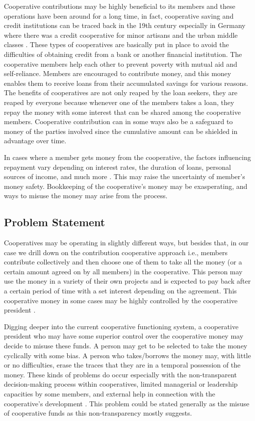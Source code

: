 \documentclass{article}
\begin{document}
\begin{flushleft}
Cooperative contributions may be highly beneficial to its members and these operations have been around for a long time, in fact, cooperative saving and credit institutions can be traced back in the 19th century especially in Germany where there was a credit cooperative for minor artisans and the urban middle classes \cite{galor2018saving}. These types of cooperatives are basically put in place to avoid the difficulties of obtaining credit from a bank or another financial institution. The cooperative members help each other to prevent poverty with mutual aid and self-reliance. Members are encouraged to contribute money, and this money enables them to receive loans from their accumulated savings for various reasons. The benefits of cooperatives are not only reaped by the loan seekers, they are reaped by everyone because whenever one of the members takes a loan, they repay the money with some interest that can be shared among the cooperative members. Cooperative contribution can in some ways also be a safeguard to money of the parties involved since the cumulative amount can be shielded in advantage over time. \cite{galor2018saving}

In cases where a member gets money from the cooperative, the factors influencing repayment vary depending on interest rates, the duration of loans, personal sources of income, and much more \cite{papias2009repayment}. This may raise the uncertainty of member’s money safety. Bookkeeping of the cooperative’s money may be exasperating, and ways to misuse the money may arise from the process.

\subsection{Problem Statement}
Cooperatives may be operating in slightly different ways, but besides that, in our case we drill down on the contribution cooperative approach i.e., members contribute collectively and then choose one of them to take all the money (or a certain amount agreed on by all members) in the cooperative. This person may use the money in a variety of their own projects and is expected to pay back after a certain period of time with a set interest depending on the agreement. This cooperative money in some cases may be highly controlled by the cooperative president \cite{nilsson2013cooperative}.

Digging deeper into the current cooperative functioning system, a cooperative president who may have some superior control over the cooperative money may decide to misuse these funds. A person may get to be selected to take the money cyclically with some bias. A person who takes/borrows the money may, with little or no difficulties, erase the traces that they are in a temporal possession of the money. These kinds of problems do occur especially with the non-transparent decision-making process within cooperatives, limited managerial or leadership capacities by some members, and external help in connection with the cooperative's development \cite{rca001}. This problem could be stated generally as the misuse of cooperative funds as this non-transparency mostly suggests.


\end{flushleft}
\end{document}
